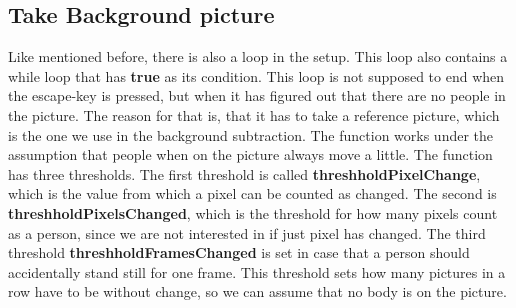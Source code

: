 \subsection{Take Background picture}
Like mentioned before, there is also a loop in the setup. This loop also contains a while loop that has \textbf{true} as its condition. This loop is not supposed to end when the escape-key is pressed, but when it has figured out that there are no people in the picture. The reason for that is, that it has to take a reference picture, which is the one we use in the background subtraction. The function works under the assumption that people when on the picture always move a little. The function has three thresholds. The first threshold is called \textbf{threshholdPixelChange}, which is the value from which a pixel can be counted as changed. The second is \textbf{threshholdPixelsChanged}, which is the threshold for how many pixels count as a person, since we are not interested in if just pixel has changed. The third threshold \textbf{threshholdFramesChanged} is set in case that a person should accidentally stand still for one frame. This threshold sets how many pictures in a row have to be without change, so we can assume that no body is on the picture. 
